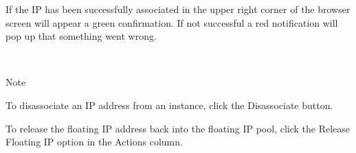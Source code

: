 If the IP has been successfully associated in the upper right corner of the browser screen will appear a green confirmation. If not successful a red notification will pop up that something went wrong.

~

Note

To disassociate an IP address from an instance, click the Disassociate
button.

To release the floating IP address back into the floating IP pool, click
the Release Floating IP option in the Actions column.
